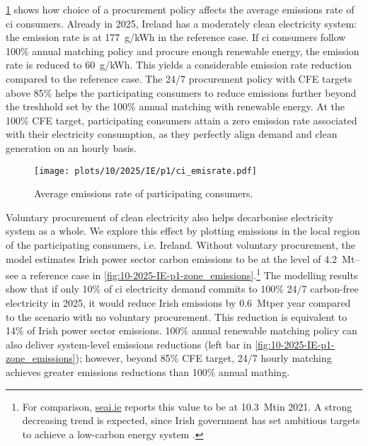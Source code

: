\cref{fig:10-2025-IE-p1-ci_emisrate} shows how choice of a procurement policy affects the average emissions rate of \gls{ci} consumers.
Already in 2025, Ireland has a moderately clean electricity system: the emission rate is at 177~g\co/kWh in the reference case. 
If \gls{ci} consumers follow 100\% annual matching policy and procure enough renewable energy, the emission rate is reduced to 60~g\co/kWh.
This yields a considerable emission rate reduction compared to the reference case.
The 24/7 procurement policy with CFE targets above 85\% helps the participating consumers to reduce emissions further beyond the treshhold set by the 100\% annual matching with renewable energy. 
At the 100\% CFE target, participating consumers attain a zero emission rate associated with their electricity consumption, as they perfectly align demand and clean generation on an hourly basis.

\begin{figure}
    \centering
    \texttt{[image: plots/10/2025/IE/p1/ci\_emisrate.pdf]}
    \caption{Average emissions rate of participating consumers.}
    \label{fig:10-2025-IE-p1-ci_emisrate}
\end{figure}

Voluntary procurement of clean electricity also helps decarbonise electricity system as a whole.
We explore this effect by plotting \co emissions in the local region of the participating consumers, i.e. Ireland.
Without voluntary procurement, the model estimates Irish power sector carbon emissions to be at the level of 4.2~Mt\co -- see a reference case in \cref{fig:10-2025-IE-p1-zone_emissions}.\footnote{For comparison, \href{https://www.seai.ie/data-and-insights/seai-statistics/key-publications/co2-emissions-report/}{seai.ie} reports this value to be at 10.3~Mt\co in 2021. A strong decreasing trend is expected, since Irish government has set ambitious targets to achieve a low-carbon energy system \cite{seaiCOEmissionsReport2020}.}
The modelling results show that if only 10\% of \gls{ci} electricity demand commits to 100\% 24/7 carbon-free electricity in 2025, it would reduce Irish emissions by 0.6~Mt\co per year compared to the scenario with no voluntary procurement.
This reduction is equivalent to 14\% of Irish power sector emissions.
100\% annual renewable matching policy can also deliver system-level \co emissions reductions (left bar in \cref{fig:10-2025-IE-p1-zone_emissions}); however, beyond 85\% CFE target, 24/7 hourly matching achieves greater emissions reductions than 100\% annual mathing.

